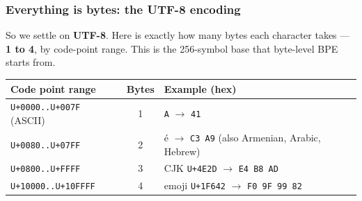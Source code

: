 \documentclass[aspectratio=169]{beamer}
\begin{document}
\begin{frame}
\frametitle{Everything is bytes: the UTF-8 encoding}
\vspace{-0.1cm}
{\small So we settle on \textbf{UTF-8}. Here is exactly how many bytes each character takes --- \textbf{1 to 4}, by code-point range. This is the 256-symbol base that byte-level BPE starts from.}

\vspace{0.25cm}
\begin{center}
{\small
\renewcommand{\arraystretch}{1.45}
\begin{tabular}{l c l}
  \textbf{Code point range} & \textbf{Bytes} & \textbf{Example (hex)}\\
  \hline
  \texttt{U+0000..U+007F} (ASCII) & 1 & \texttt{A} $\to$ \texttt{41}\\
  \texttt{U+0080..U+07FF} & 2 & \'e $\to$ \texttt{C3 A9} \; {\scriptsize (also Armenian, Arabic, Hebrew)}\\
  \texttt{U+0800..U+FFFF} & 3 & CJK \texttt{U+4E2D} $\to$ \texttt{E4 B8 AD}\\
  \texttt{U+10000..U+10FFFF} & 4 & emoji \texttt{U+1F642} $\to$ \texttt{F0 9F 99 82}\\
  \hline
\end{tabular}
}
\end{center}

\vspace{0.3cm}
\begin{center}
\end{center}
\end{frame}

\end{document}
